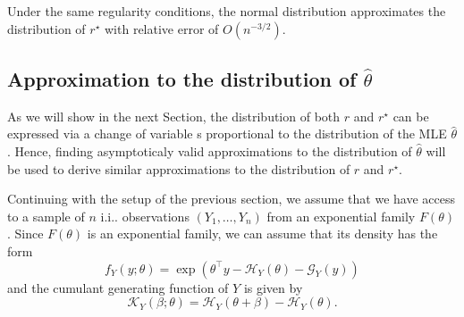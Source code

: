 Under the same regularity conditions, the normal distribution approximates the distribution of $r^\star$ with relative error of $O(n^{-3/2})$.

\subsection{Approximation to the distribution of $\hat\theta$}

As we will show in the next Section, the distribution of both $r$ and $r^\star$ can be expressed via a change of variable s proportional to the distribution of the MLE $\hat\theta$. Hence, finding   asymptoticaly valid approximations to the distribution of $\hat\theta$ will be used to derive similar approximations to the distribution of $r$ and $r^\star$.

Continuing with the setup of the previous section, we assume that we have access to a sample of $n$ i.i.. observations $(Y_1, \ldots, Y_n)$ from an exponential family $F(\theta)$. Since $F(\theta)$ is an exponential family, we can assume that its density has the form
\begin{equation*}
    f_Y(y; \theta) = \exp\left(\theta^\top y - \mathcal{H}_Y(\theta) - \mathcal{G}_Y(y)\right)
\end{equation*}
and the cumulant generating function of $Y$ is given by
\begin{equation*}
    \mathcal{K}_Y(\beta; \theta) = \mathcal{H}_Y(\theta + \beta) - \mathcal{H}_Y(\theta).
\end{equation*}

